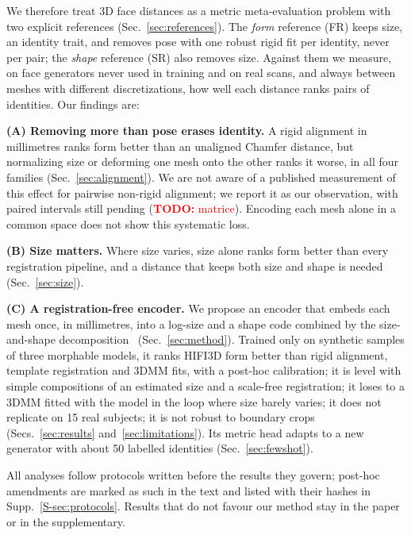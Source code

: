 \documentclass[10pt,twocolumn,letterpaper]{article}
\newcommand{\todo}[1]{\textcolor{red}{\textbf{TODO:} #1}}
\begin{document}
We therefore treat 3D face distances as a metric meta-evaluation problem with two explicit references (Sec.~\ref{sec:references}). The \emph{form} reference (FR) keeps size, an identity trait, and removes pose with one robust rigid fit per identity, never per pair; the \emph{shape} reference (SR) also removes size. Against them we measure, on face generators never used in training and on real scans, and always between meshes with different discretizations, how well each distance ranks pairs of identities. Our findings are:

\noindent\textbf{(A) Removing more than pose erases identity.} A rigid alignment in millimetres ranks form better than an unaligned Chamfer distance, but normalizing size or deforming one mesh onto the other ranks it worse, in all four families (Sec.~\ref{sec:alignment}). We are not aware of a published measurement of this effect for pairwise non-rigid alignment; we report it as our observation, with paired intervals still pending (\todo{matrice}). Encoding each mesh alone in a common space does not show this systematic loss.

\noindent\textbf{(B) Size matters.} Where size varies, size alone ranks form better than every registration pipeline, and a distance that keeps both size and shape is needed (Sec.~\ref{sec:size}).

\noindent\textbf{(C) A registration-free encoder.} We propose an encoder that embeds each mesh once, in millimetres, into a log-size and a shape code combined by the size-and-shape decomposition~\cite{kendall1984shape,dryden2016statistical} (Sec.~\ref{sec:method}). Trained only on synthetic samples of three morphable models, it ranks HIFI3D form better than rigid alignment, template registration and 3DMM fits, with a post-hoc calibration; it is level with simple compositions of an estimated size and a scale-free registration; it loses to a 3DMM fitted with the model in the loop where size barely varies; it does not replicate on 15 real subjects; it is not robust to boundary crops (Secs.~\ref{sec:results} and~\ref{sec:limitations}). Its metric head adapts to a new generator with about 50 labelled identities (Sec.~\ref{sec:fewshot}).

All analyses follow protocols written before the results they govern; post-hoc amendments are marked as such in the text and listed with their hashes in Supp.~\ref{S-sec:protocols}. Results that do not favour our method stay in the paper or in the supplementary.

\end{document}
